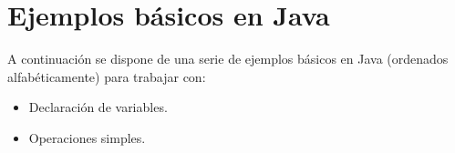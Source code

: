 \chapter{Ejemplos básicos en Java}

A continuación se dispone de una serie de ejemplos básicos en Java (ordenados alfabéticamente) para trabajar con:

\begin{itemize}
	\item Declaración de variables.
	\item Operaciones simples.
\end{itemize}

\centering

\begin{framed}
		
\end{framed}

\begin{framed}
	
\end{framed}

\begin{framed}
	
\end{framed}

\begin{framed}
	
\end{framed}

\begin{framed}
	
\end{framed}


\begin{framed}
	
\end{framed}


